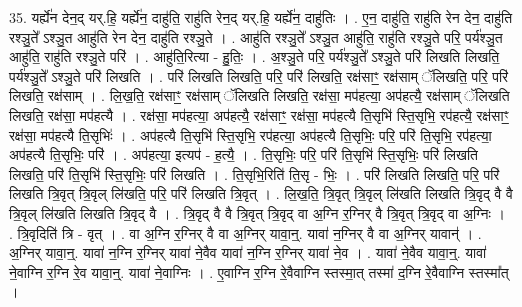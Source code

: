 \documentclass[17pt]{extarticle}
\begin{document}
35. यर्ह्ये॑न देन॒द् यर्.हि॒ यर्ह्ये॑न॒ दाहु॑ति॒ राहु॑ति रेन॒द् यर्.हि॒ यर्ह्ये॑न॒ दाहु॑तिः । . ए॒न॒ दाहु॑ति॒ राहु॑ति रेन देन॒ दाहु॑ति रश्ञु॒ते᳚ ऽश्ञु॒त आहु॑ति रेन देन॒ दाहु॑ति रश्ञु॒ते । . आहु॑ति रश्ञु॒ते᳚ ऽश्ञु॒त आहु॑ति॒ राहु॑ति रश्ञु॒ते परि॒ पर्य॑श्ञु॒त आहु॑ति॒ राहु॑ति रश्ञु॒ते परि॑ । . आहु॑ति॒रित्या - हु॒तिः॒ । . अ॒श्ञु॒ते परि॒ पर्य॑श्ञु॒ते᳚ ऽश्ञु॒ते परि॑ लिखति लिखति॒ पर्य॑श्ञु॒ते᳚ ऽश्ञु॒ते परि॑ लिखति । . परि॑ लिखति लिखति॒ परि॒ परि॑ लिखति॒ रक्ष॑साꣳ॒॒ रक्ष॑साम् ॅलिखति॒ परि॒ परि॑ लिखति॒ रक्ष॑साम् । . लि॒ख॒ति॒ रक्ष॑साꣳ॒॒ रक्ष॑साम् ॅलिखति लिखति॒ रक्ष॑सा॒ मप॑हत्या॒ अप॑हत्यै॒ रक्ष॑साम् ॅलिखति लिखति॒ रक्ष॑सा॒ मप॑हत्यै । . रक्ष॑सा॒ मप॑हत्या॒ अप॑हत्यै॒ रक्ष॑साꣳ॒॒ रक्ष॑सा॒ मप॑हत्यै ति॒सृभि॑ स्ति॒सृभि॒ रप॑हत्यै॒ रक्ष॑साꣳ॒॒ रक्ष॑सा॒ मप॑हत्यै ति॒सृभिः॑ । . अप॑हत्यै ति॒सृभि॑ स्ति॒सृभि॒ रप॑हत्या॒ अप॑हत्यै ति॒सृभिः॒ परि॒ परि॑ ति॒सृभि॒ रप॑हत्या॒ अप॑हत्यै ति॒सृभिः॒ परि॑ । . अप॑हत्या॒ इत्यप॑ - ह॒त्यै॒ । . ति॒सृभिः॒ परि॒ परि॑ ति॒सृभि॑ स्ति॒सृभिः॒ परि॑ लिखति लिखति॒ परि॑ ति॒सृभि॑ स्ति॒सृभिः॒ परि॑ लिखति । . ति॒सृभि॒रिति॑ ति॒सृ - भिः॒ । . परि॑ लिखति लिखति॒ परि॒ परि॑ लिखति त्रि॒वृत् त्रि॒वृल् लि॑खति॒ परि॒ परि॑ लिखति त्रि॒वृत् । . लि॒ख॒ति॒ त्रि॒वृत् त्रि॒वृल् लि॑खति लिखति त्रि॒वृद् वै वै त्रि॒वृल् लि॑खति लिखति त्रि॒वृद् वै । . त्रि॒वृद् वै वै त्रि॒वृत् त्रि॒वृद् वा अ॒ग्नि र॒ग्निर् वै त्रि॒वृत् त्रि॒वृद् वा अ॒ग्निः । . त्रि॒वृदिति॑ त्रि - वृत् । . वा अ॒ग्नि र॒ग्निर् वै वा अ॒ग्निर् यावा॒न्॒. यावा॑ न॒ग्निर् वै वा अ॒ग्निर् यावान्॑ । . अ॒ग्निर् यावा॒न्॒. यावा॑ न॒ग्नि र॒ग्निर् यावा॑ ने॒वैव यावा॑ न॒ग्नि र॒ग्निर् यावा॑ ने॒व । . यावा॑ ने॒वैव यावा॒न्॒. यावा॑ ने॒वाग्नि र॒ग्नि रे॒व यावा॒न्॒. यावा॑ ने॒वाग्निः । . ए॒वाग्नि र॒ग्नि रे॒वैवाग्नि स्तस्मा॒त् तस्मा॑ द॒ग्नि रे॒वैवाग्नि स्तस्मा᳚त् । \newline
\end{document}
